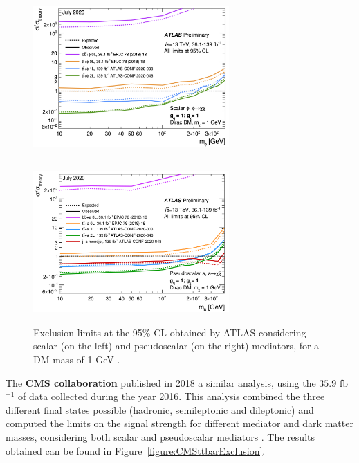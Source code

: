 \documentclass[a4paper, 10pt, openright]{report}
\begin{document}
\begin{figure}[htbp]
\centering
\begin{minipage}[b]{.4\textwidth}
\includegraphics[width=7.5cm, height=6.2cm]{figs/ATLASttDM_scalar.png}
\end{minipage}\hfill
\begin{minipage}[b]{.48\textwidth}
\includegraphics[width=7.5cm, height=6.2cm]{figs/ATLASttDM_pseudoscalar.png}
\end{minipage}\hfill
\caption{Exclusion limits at the 95\% \ac{CL} obtained by \ac{ATLAS} considering  scalar (on the left) and pseudoscalar (on the right) mediators, for a \ac{DM} mass of 1 GeV \cite{ATLASICHEP2020}.}
\label{fig:ATLASICHEP2}
\end{figure}

The \textbf{\ac{CMS} collaboration} published in 2018 a similar analysis, using the $35.9$ fb$^{-1}$ of data collected during the year 2016. This analysis combined the three different final states possible (hadronic, semileptonic and dileptonic) and computed the limits on the signal strength for different mediator and dark matter masses, considering both scalar and pseudoscalar mediators \cite{PreviousDoubleTopAllLep13CMS}. The results obtained can be found in Figure~\ref{figure:CMSttbarExclusion}. 
\end{document}
